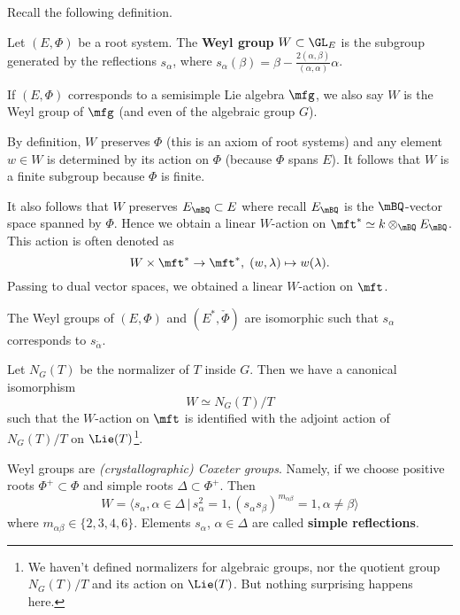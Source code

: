 Recall the following definition.

\begin{defn}
	Let $(E,\Phi)$ be a root system. The \textbf{Weyl group} $W\subset \GL_E$ is the subgroup generated by the reflections $s_\alpha$, where $s_\alpha(\beta) = \beta - \frac{2(\alpha,\beta)}{(\alpha,\alpha)} \alpha$.

	If $(E,\Phi)$ corresponds to a semisimple Lie algebra $\mfg$, we also say $W$ is the Weyl group of $\mfg$ (and even of the algebraic group $G$).
\end{defn}

\begin{rem}
	By definition, $W$ preserves $\Phi$ (this is an axiom of root systems) and any element $w\in W$ is determined by its action on $\Phi$ (because $\Phi$ spans $E$). It follows that $W$ is a finite subgroup because $\Phi$ is finite.
\end{rem}



\begin{rem}
	It also follows that $W$ preserves $E_\mBQ\subset E$ where recall $E_\mBQ$ is the $\mBQ$-vector space spanned by $\Phi$. Hence we obtain a linear $W$-action on $\mft^* \simeq k\ot_\mBQ E_\mBQ$. This action is often denoted as
	\[
		W\times \mft^* \to \mft^*,\; (w,\lambda)\mapsto w(\lambda).
	\]
	Passing to dual vector spaces, we obtained a linear $W$-action on $\mft$.
\end{rem}

\begin{rem}
	The Weyl groups of $(E,\Phi)$ and $(E^*,\check\Phi)$ are isomorphic such that $s_\alpha$ corresponds to $s_{\check \alpha}$.
\end{rem}

\begin{prop}
	Let $N_G(T)$ be the normalizer of $T$ inside $G$. Then we have a canonical isomorphism
	\[
		W\simeq N_G(T)/T
	\]
	such that the $W$-action on $\mft$ is identified with the adjoint action of $N_G(T)/T$ on $\Lie(T)$\footnote{We haven't defined normalizers for algebraic groups, nor the quotient group $N_G(T)/T$ and its action on $\Lie(T)$. But nothing surprising happens here.}.
\end{prop}

\begin{rem}
	Weyl groups are \emph{(crystallographic) Coxeter groups}. Namely, if we choose positive roots $\Phi^+\subset \Phi$ and simple roots $\mathsf{\Delta}\subset \Phi^+$. Then
	\[
		W  = \langle s_\alpha, \alpha\in \mathsf{\Delta} \,\vert\, s_\alpha^2=1, (s_\alpha s_\beta)^{m_{\alpha\beta}}=1, \alpha\neq \beta \rangle
	\]
	where $m_{\alpha\beta}\in \{2,3,4,6\}$. Elements $s_\alpha$, $\alpha\in \Delta$ are called \textbf{simple reflections}.
\end{rem}

